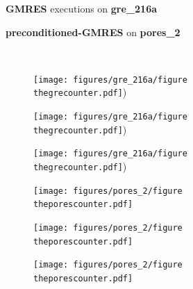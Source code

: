 \documentclass[twoside]{article}
\newcounter{fig}\setcounter{fig}{0}
\begin{document}
  \begin{figure}[H]
    \centering
    
    \begin{minipage}[b]{0.45\linewidth}
      \centering
      \textbf{GMRES} executions on \textbf{gre_216a} 
    \end{minipage}
    \quad
    \begin{minipage}{0.45\linewidth}
      \centering
      \textbf{preconditioned-GMRES} on \textbf{pores_2}
    \end{minipage}\\


    \begin{minipage}[b]{0.48\linewidth}
      \begin{subfigure}[t]{\linewidth}
        \centering
        \texttt{[image: figures/gre\_216a/figure\\thegrecounter.pdf]})
        \caption{}\label{fig:gre_216a_conv_hist_checksum_0}		
      \end{subfigure}
      \quad
      \begin{subfigure}[t]{\linewidth}
        \centering
        \texttt{[image: figures/gre\_216a/figure\\thegrecounter.pdf]})
        \caption{}\label{fig:gre_216a_conv_hist_checksum_1}
      \end{subfigure}
      \quad
      \begin{subfigure}[t]{\linewidth}
        \centering
        \texttt{[image: figures/gre\_216a/figure\\thegrecounter.pdf]})
        \caption{}\label{fig:gre_216a_conv_hist_checksum_2}
      \end{subfigure}
    \end{minipage}
    \quad
    \begin{minipage}[b]{0.48\linewidth}
      \begin{subfigure}[t]{\linewidth}
        \centering
        \texttt{[image: figures/pores\_2/figure\\theporescounter.pdf]}
        \caption{}\label{fig:pores_2_conv_hist_checksum_0}		
      \end{subfigure}
      \quad
      \begin{subfigure}[t]{\linewidth}
        \centering
        \texttt{[image: figures/pores\_2/figure\\theporescounter.pdf]}
        \caption{}\label{fig:pores_2_conv_hist_checksum_1}
      \end{subfigure}
      \quad
      \begin{subfigure}[t]{\linewidth}
        \centering
        \texttt{[image: figures/pores\_2/figure\\theporescounter.pdf]}
        \caption{}\label{fig:pores_2_conv_hist_checksum_2}
      \end{subfigure}


\end{minipage}
\end{figure}
\end{document}
